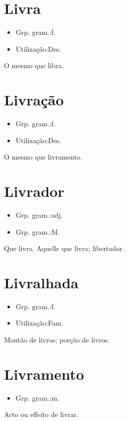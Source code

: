 \section{Livra}
\begin{itemize}
\item {Grp. gram.:f.}
\end{itemize}
\begin{itemize}
\item {Utilização:Des.}
\end{itemize}
O mesmo que \textunderscore libra\textunderscore .
\section{Livração}
\begin{itemize}
\item {Grp. gram.:f.}
\end{itemize}
\begin{itemize}
\item {Utilização:Des.}
\end{itemize}
O mesmo que \textunderscore livramento\textunderscore .
\section{Livrador}
\begin{itemize}
\item {Grp. gram.:adj.}
\end{itemize}
\begin{itemize}
\item {Grp. gram.:M.}
\end{itemize}
Que livra.
Aquelle que livra; libertador.
\section{Livralhada}
\begin{itemize}
\item {Grp. gram.:f.}
\end{itemize}
\begin{itemize}
\item {Utilização:Fam.}
\end{itemize}
Montão de livros; porção de livros.
\section{Livramento}
\begin{itemize}
\item {Grp. gram.:m.}
\end{itemize}
Acto ou effeito de livrar.

